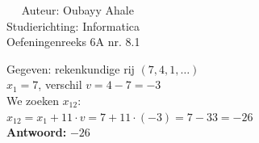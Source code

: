 \documentclass[a4paper]{article}
\begin{document}
  
\noindent \large Auteur: Oubayy Ahale         \\
\noindent \large Studierichting: Informatica  \\
\noindent \large Oefeningenreeks 6A nr. 8.1   \\

\medskip

\normalsize

Gegeven: rekenkundige rij $(7, 4, 1, \dots) $\\

$x_1 = 7$, verschil $v = 4 - 7 = -3         $\\

We zoeken $x_{12}$: \\

$x_{12} = x_1 + 11 \cdot v = 7 + 11 \cdot (-3) = 7 - 33 = -26 $\\

\textbf{Antwoord:} $\boxed{-26}$\\
\end{document}
